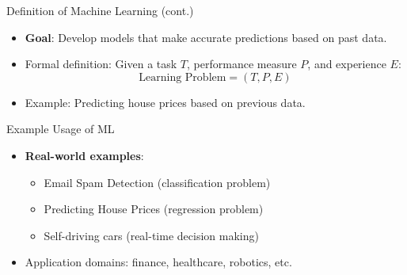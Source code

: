 \documentclass[serif, aspectratio=169]{beamer}
\begin{document}
\begin{frame}{Definition of Machine Learning (cont.)}
\begin{itemize}
    \item \textbf{Goal}: Develop models that make accurate predictions based on past data.
    \item Formal definition: Given a task \(T\), performance measure \(P\), and experience \(E\):
    \[
    \text{Learning Problem} = (T, P, E)
    \]
    \item Example: Predicting house prices based on previous data.
\end{itemize}
\end{frame}

\begin{frame}{Example Usage of ML}
\begin{itemize}
    \item \textbf{Real-world examples}:
    \begin{itemize}
        \item Email Spam Detection (classification problem)
        \item Predicting House Prices (regression problem)
        \item Self-driving cars (real-time decision making)
    \end{itemize}
    \item Application domains: finance, healthcare, robotics, etc.
\end{itemize}
\end{frame}
\end{document}
